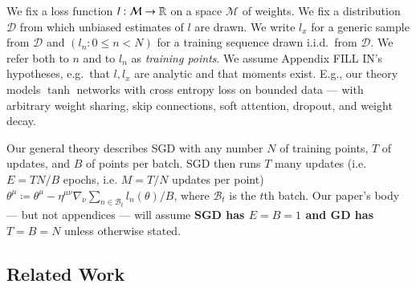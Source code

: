 \documentclass{article}
\theoremstyle{plain}
\theoremstyle{definition}
\newcommand{\Bb}{\mathcal{B}}
\newcommand{\Dd}{\mathcal{D}}
\newcommand{\Mm}{\mathcal{M}}
\begin{document}
        We fix a loss function $l:\Mm\to\RR$ on a space $\Mm$ of weights.  We
        fix a distribution $\Dd$ from which unbiased estimates of $l$ are
        drawn.  We write $l_x$ for a generic sample from $\Dd$ and $(l_n: 0\leq
        n<N)$ for a training sequence drawn i.i.d.\ from $\Dd$.  We refer both
        to $n$ and to $l_n$ as \emph{training points}.  We assume Appendix
        {\color{red} FILL IN}'s hypotheses, e.g.\ that $l, l_x$ are
        analytic and that moments exist.
        E.g., our theory models $\tanh$ networks with cross entropy loss on
        bounded data --- with arbitrary weight sharing, skip connections, soft
        attention, dropout, and weight decay.
        

        Our general theory describes SGD with any number
             $N$ of training points,
             $T$ of updates, and 
             $B$ of points per batch.
        SGD then runs $T$ many updates (i.e. $E=TN/B$ epochs, i.e. $M=T/N$
        updates per point)
        $
            \theta^\mu
            \coloneqq
            \theta^\mu -
            \eta^{\mu\nu} \nabla_\nu
                \sum_{n\in \Bb_t} l_n(\theta) / B
        $,
        where $\Bb_t$ is the $t$th batch.  Our paper's body --- but not
        appendices --- will assume \textbf{SGD has $E=B=1$ and GD has $T=B=N$}
        unless otherwise stated.


\subsection{Related Work} \label{sect:related}

\end{document}
